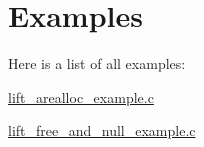 \section{Examples}
Here is a list of all examples\-:\begin{DoxyCompactItemize}
\item 
\hyperlink{lift_arealloc_example_8c-example}{lift\-\_\-arealloc\-\_\-example.\-c}
\item 
\hyperlink{lift_free_and_null_example_8c-example}{lift\-\_\-free\-\_\-and\-\_\-null\-\_\-example.\-c}
\end{DoxyCompactItemize}
